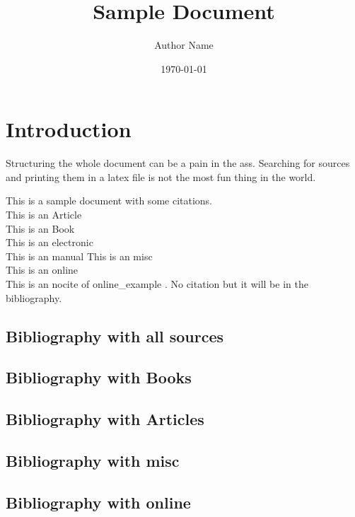 \documentclass{article}
\title{Sample Document}
\author{Author Name}
\date{\today}
\begin{document}
\section{Introduction}
Structuring the whole document can be a pain in the ass. Searching for sources and printing them in a latex file is not the most fun thing in the world. 

This is a sample document with some citations. \\
This is an Article \cite{ArticleSource}\\
This is an Book \cite{example_Book}\\
This is an electronic \cite{example} \\
This is an manual \cite{Ch340_1D}
This is an misc \cite{MiscKey} \\
This is an online \cite{WinNT}\\

This is an nocite of online\_example \nocite{online_example}. No citation but it will be in the bibliography.


\printbibliography[
heading=bibintoc,
title={Whole bibliography}
]

\newpage
\subsection{Bibliography with all sources}
\printbibliography[title={All sources}]

\subsection{Bibliography with Books}
\printbibliography[title={Books}, type=book]

\subsection{Bibliography with Articles}
\printbibliography[title={Articles}, type=article]

\subsection{Bibliography with misc}
\printbibliography[title={misc}, type=misc]

\subsection{Bibliography with online}
\printbibliography[title={online}, type=online]
\end{document}
